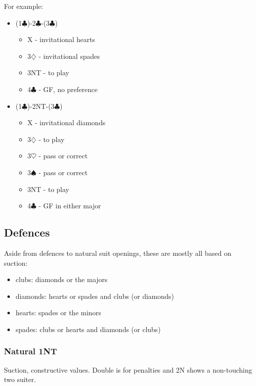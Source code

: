 \documentclass[a4paper,14pt]{extarticle}
\begin{document}
\newpage

For example:

\begin{itemize}
\item (1$\clubsuit$)-2$\clubsuit$-(3$\clubsuit$)
	\begin{itemize}
	\item X - invitational hearts
	\item 3$\diamondsuit$ - invitational spades
	\item 3NT - to play
	\item 4$\clubsuit$ - GF, no preference
	\end{itemize}
\item (1$\clubsuit$)-2NT-(3$\clubsuit$)
	\begin{itemize}
	\item X - invitational diamonds
	\item 3$\diamondsuit$ - to play
	\item 3$\heartsuit$ - pass or correct
	\item 3$\spadesuit$ - pass or correct
	\item 3NT - to play
	\item 4$\clubsuit$ - GF in either major
	\end{itemize}
\end{itemize}

\newpage

\subsection{Defences}
\label{sec:defences}

Aside from defences to natural suit openings, these are mostly all based on suction:

\begin{itemize}
\item clubs: diamonds or the majors
\item diamonds: hearts or spades and clubs (or diamonds)
\item hearts: spades or the minors
\item spades: clubs or hearts and diamonds (or clubs)
\end{itemize}

\subsubsection{Natural 1NT}
\label{sec:def:1n}

Suction, constructive values. Double is for penalties and 2N shows a
non-touching two suiter. 
\end{document}
